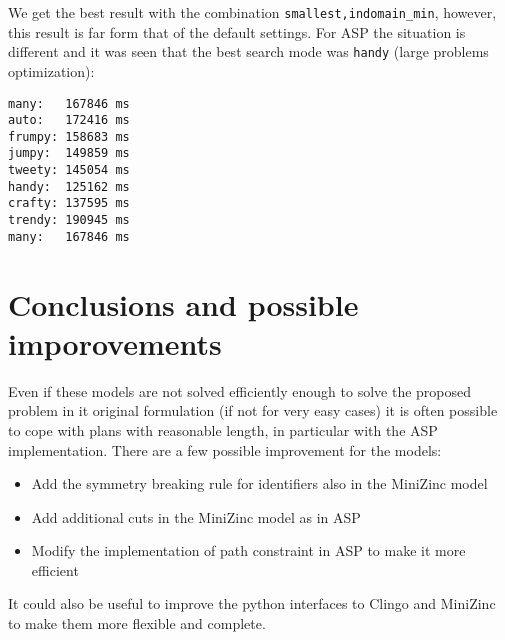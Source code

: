 \documentclass[11pt]{article}
\begin{document}
We get the best result with the combination \verb+smallest,indomain_min+, however, this result is far form that of the default settings.
For ASP the situation is different and it was seen that the best search mode was \verb+handy+ (large problems optimization):
\begin{verbatim}
many:   167846 ms
auto:   172416 ms
frumpy: 158683 ms
jumpy:  149859 ms
tweety: 145054 ms
handy:  125162 ms
crafty: 137595 ms
trendy: 190945 ms
many:   167846 ms
\end{verbatim}
\section{Conclusions and possible imporovements}
Even if these models are not solved efficiently enough to solve the proposed problem in it original formulation (if not for very easy cases) 
it is often possible to cope with plans with reasonable length, in particular with the ASP implementation. 
There are a few possible improvement for the models:
\begin{itemize}
\item Add the symmetry breaking rule for identifiers also in the MiniZinc model
\item Add additional cuts in the MiniZinc model as in ASP
\item Modify the implementation of path constraint in ASP to make it more efficient 
\end{itemize} 
It could also be useful to improve the python interfaces to Clingo and MiniZinc to make them more flexible and complete.
\end{document}
